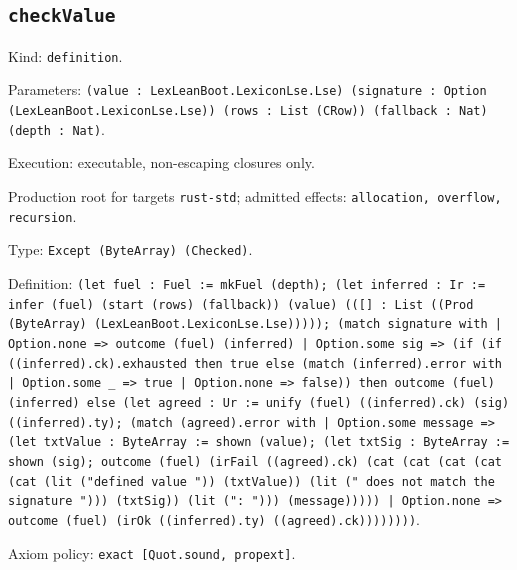 \documentclass[11pt]{article}
\begin{document}
\subsection*{\texttt{checkValue}}
\noindent Kind: \texttt{definition}.\par
\noindent Parameters: \texttt{(value : LexLeanBoot.LexiconLse.Lse) (signature : Option (LexLeanBoot.LexiconLse.Lse)) (rows : List (CRow)) (fallback : Nat) (depth : Nat)}.\par
\noindent Execution: executable, non-escaping closures only.\par
\noindent Production root for targets \texttt{rust-std}; admitted effects: \texttt{allocation, overflow, recursion}.\par
\noindent Type: \texttt{Except (ByteArray) (Checked)}.\par
\noindent Definition: \texttt{(let fuel : Fuel := mkFuel (depth); (let inferred : Ir := infer (fuel) (start (rows) (fallback)) (value) (([] : List ((Prod (ByteArray) (LexLeanBoot.LexiconLse.Lse))))); (match signature with | Option.none => outcome (fuel) (inferred) | Option.some sig => (if (if ((inferred).ck).exhausted then true else (match (inferred).error with | Option.some \_ => true | Option.none => false)) then outcome (fuel) (inferred) else (let agreed : Ur := unify (fuel) ((inferred).ck) (sig) ((inferred).ty); (match (agreed).error with | Option.some message => (let txtValue : ByteArray := shown (value); (let txtSig : ByteArray := shown (sig); outcome (fuel) (irFail ((agreed).ck) (cat (cat (cat (cat (cat (lit ("defined value ")) (txtValue)) (lit (" does not match the signature "))) (txtSig)) (lit (": "))) (message))))) | Option.none => outcome (fuel) (irOk ((inferred).ty) ((agreed).ck))))))))}.\par
\noindent Axiom policy: \texttt{exact [Quot.sound, propext]}.\par
\end{document}
